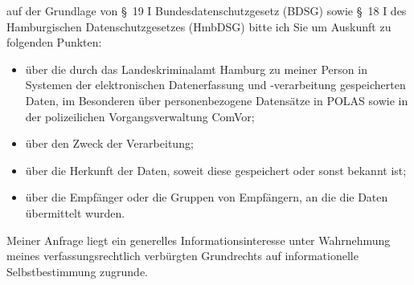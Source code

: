 auf der Grundlage von §~19 I Bundesdatenschutzgesetz (BDSG) sowie
§~18 I des Hamburgischen Datenschutzgesetzes (HmbDSG) bitte ich Sie um Auskunft
zu folgenden Punkten:

\begin{itemize}
  \item über die durch das Landeskriminalamt Hamburg zu meiner Person in Systemen
  der elektronischen Datenerfassung und -verarbeitung gespeicherten Daten, im
  Besonderen über personenbezogene Datensätze in POLAS sowie in der polizeilichen
  Vorgangsverwaltung ComVor;

  \item über den Zweck der Verarbeitung;

  \item über die Herkunft der Daten, soweit diese gespeichert oder sonst bekannt ist;

  \item über die Empfänger oder die Gruppen von Empfängern, an die die Daten übermittelt wurden.
\end{itemize}

Meiner Anfrage liegt ein generelles Informationsinteresse unter Wahrnehmung
meines verfassungsrechtlich verbürgten Grundrechts auf informationelle
Selbstbestimmung zugrunde.
